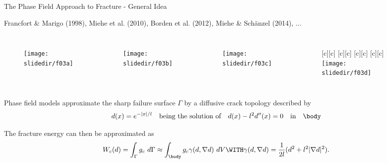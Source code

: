 
\begin{frame}{The Phase Field Approach to Fracture - General Idea}

\begin{reference}{}{}
Francfort \& Marigo (1998), Miehe et al. (2010), Borden et al. (2012), Miehe \& Sch\"anzel (2014), ...
\end{reference}

\begin{columns} 
  \centering
  \begin{figure}
    \texttt{[image: \\slidedir/f03a]}
  \end{figure}

  \centering
  \begin{figure}
    \texttt{[image: \\slidedir/f03b]}
  \end{figure}

  \centering
  \begin{figure}
    \texttt{[image: \\slidedir/f03c]}
  \end{figure}


  \centering
  \begin{figure}
  {\footnotesize
  [c][c]{\scriptsize{}}
  [c][c]{\scriptsize{}}
  [c][c]{\scriptsize{}}
  [c][c]{\scriptsize{}}
  \texttt{[image: \\slidedir/f03d]}}
  \end{figure}
\end{columns}

\bigskip
\bigskip
\bigskip

Phase field models approximate the sharp failure surface $\Gamma$ by a diffusive crack topology described by 
\begin{equation*}
  d(x)=e^{-|x|/l} \quad \text{being the solution of} \quad d(x)-l^2d''(x)=0 \quad \text{in} \quad \body
\end{equation*}

\smallskip

The fracture energy can then be approximated as
\begin{equation*}
  W_c(d)=\int_{\Gamma} g_c~d\Gamma \approx \int_{\body}g_c \gamma(d,\nabla d)~dV 
\WITH  
\gamma(d,\nabla d)=\frac{1}{2l}( d^2+l^2 |\nabla d|^2 ).
\end{equation*}

\end{frame}





